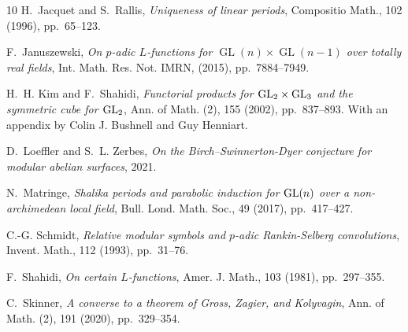 \begin{thebibliography}{10}
{\sc H.~Jacquet and S.~Rallis}, {\em Uniqueness of linear periods}, Compositio
  Math., 102 (1996), pp.~65--123.

{\sc F.~Januszewski}, {\em On {$p$}-adic {$L$}-functions for
  {$\operatorname{GL}(n)\times\operatorname{GL}(n-1)$} over totally real
  fields}, Int. Math. Res. Not. IMRN,  (2015), pp.~7884--7949.

{\sc H.~H. Kim and F.~Shahidi}, {\em Functorial products for {${\rm
  GL}_2\times{\rm GL}_3$} and the symmetric cube for {${\rm GL}_2$}}, Ann. of
  Math. (2), 155 (2002), pp.~837--893.
\newblock With an appendix by Colin J. Bushnell and Guy Henniart.

{\sc D.~Loeffler and S.~L. Zerbes}, {\em On the Birch--Swinnerton-Dyer
  conjecture for modular abelian surfaces}, 2021.

{\sc N.~Matringe}, {\em Shalika periods and parabolic induction for {${\rm GL}(n)$}
  over a non-archimedean local field}, Bull. Lond. Math. Soc., 49 (2017),
  pp.~417--427.  
  
{\sc C.-G. Schmidt}, {\em Relative modular symbols and {$p$}-adic
  {R}ankin-{S}elberg convolutions}, Invent. Math., 112 (1993), pp.~31--76.

{\sc F.~Shahidi}, {\em On certain {$L$}-functions}, Amer. J. Math., 103 (1981),
  pp.~297--355.

{\sc C.~Skinner}, {\em A converse to a theorem of {G}ross, {Z}agier, and {K}olyvagin}, 
Ann. of Math. (2), 191 (2020), pp.~329--354. 
\end{thebibliography}
